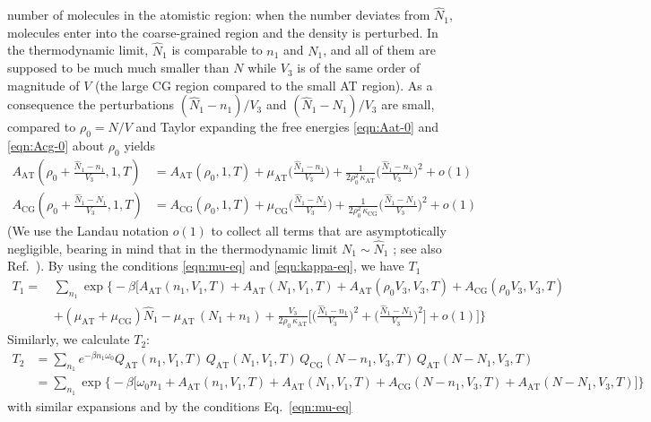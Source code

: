 \documentclass[aip,jcp,a4paper,reprint,onecolumn]{revtex4-1}
\newcommand{\AT}{{\textrm{{AT}}}}
\newcommand{\CG}{{\textrm{CG}}}
\begin{document}
number of molecules in the atomistic region: when the number
deviates from $\hat N_1$, molecules enter into the coarse-grained
region and the density is perturbed.
In the thermodynamic
limit, $\hat N_1$ is comparable to $n_1$ and $N_1$, and all of them are
supposed to be much much smaller than $N$ while $V_3$ is of the same order of magnitude of $V$ (the large CG region compared to the small AT region). As a consequence the perturbations
$(\hat N_1 - n_1)/{V_3}$ and $(\hat N_1 - N_1)/{V_3}$ are small, compared to $\rho_0 = N/V$ and
Taylor expanding the free energies \eqref{eqn:Aat-0} and \eqref{eqn:Acg-0}
about $\rho_0$ yields
\begin{align}
  A_{\AT}(\rho_0 + \frac{\hat N_1 - n_1}{V_3},1,T)
  &= A_{\AT}(\rho_0,1,T)
  +\mu_{\AT}
  \Big(
  \frac{\hat N_1 - n_1}{V_3}
  \Big)
  +
  \frac1{2\rho_0^2\,\kappa_{\AT}}
  \Big(
  \frac{\hat N_1 - n_1}{V_3}
  \Big)^2
  + o(1) \\
  A_{\CG}(\rho_0 + \frac{\hat N_1 - N_1}{V_3},1,T)
  &= A_{\CG}(\rho_0,1,T)
  +\mu_{\CG}
  \Big(
  \frac{\hat N_1 - N_1}{V_3}
  \Big)
  +
  \frac1{2\rho_0^2\,\kappa_{\CG}}
  \Big(
  \frac{\hat N_1 - N_1}{V_3}
  \Big)^2
  + o(1)
\end{align}
(We use the Landau notation $o(1)$ to collect all terms that are asymptotically negligible, bearing in mind that in the thermodynamic limit $N_{1}\sim\hat{N}_{1}$ ;  see also Ref.~).
By using the conditions \eqref{eqn:mu-eq} and \eqref{eqn:kappa-eq},
we have $T_1$
\begin{align}\nonumber
  T_1
  = \,&
  \sum_{n_1}
  \exp
  \Big\{-\beta
  \Big[
  A_{\AT}(n_1,V_1,T) +
  A_{\AT}(N_1,V_1,T) +
  A_{\AT}(\rho_0V_3,V_3,T) +
  A_{\CG}(\rho_0V_3,V_3,T) \\
  \,&+(\mu_\AT + \mu_\CG)\hat N_1
  -\mu_{\AT}\,(N_1 + n_1) +
  \frac{V_3}{2\rho_0\, \kappa_{\AT}}
  \Big[
  \Big(
  \frac{\hat N_1 - n_1}{V_3}
  \Big)^2
  +
  \Big(
  \frac{\hat N_1 - N_1}{V_3}
  \Big)^2
  \Big]
  + o(1)
  \Big]
  \Big\}
\end{align}
Similarly, we calculate $T_2$:
\begin{align}\nonumber
  T_2
  &=
  \sum_{n_1}
  e^{-\beta n_1\omega_0}
  Q_{\AT}(n_1,V_1,T)\,
  Q_{\AT}(N_1,V_1,T)\,
  Q_{\CG}(N-n_1,V_3,T)\,
  Q_{\AT}(N-N_1,V_3,T) \\\nonumber
  &=
  \sum_{n_1}
  \exp
  \big\{-\beta
  \big[
  \omega_0n_1 +
  A_{\AT}(n_1,V_1,T) +
  A_{\AT}(N_1,V_1,T) +
  A_{\CG}(N-n_1,V_3,T) +
  A_{\AT}(N-N_1,V_3,T)
  \big]
  \big\}
\end{align}
with similar expansions and by the conditions Eq.~\eqref{eqn:mu-eq}
\end{document}
